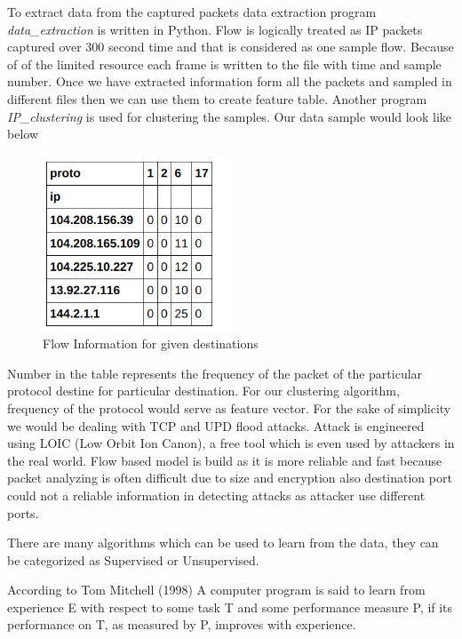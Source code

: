\documentclass[10pt,oneside,a4paper]{report}
\begin{document}
To extract data from the captured packets data extraction program \textit{data\_extraction} is written in Python. Flow is logically treated as IP packets captured over 300 second time and that is considered as one sample flow. Because of of the limited resource each frame is written to the file with time and sample number. Once we have extracted information form all the packets and sampled in different files then we can use them to create feature table. Another program \textit{IP\_clustering} is used for clustering the samples. Our data sample would look like below\par
\begin{figure}[H]
  \centering
    \includegraphics[width=0.50\textwidth]{dataframe.png}
    \caption{Flow Information for given destinations}
\end{figure}


Number in the table represents the frequency of the packet of the particular protocol destine for particular destination. For our clustering algorithm, frequency of the protocol would serve as feature vector. For the sake of simplicity we would be dealing with TCP and UPD flood attacks. Attack is engineered using LOIC (Low Orbit Ion Canon), a free tool which is even used by attackers in the real world. Flow based model is build as it is more reliable and fast because packet analyzing is often difficult due to size and encryption also destination port could not a reliable information in detecting attacks as attacker use different ports.

There are many algorithms which can be used to learn from the data, they can be categorized as Supervised or Unsupervised.

According to Tom Mitchell (1998) A computer program is said to learn from experience E with respect to some task T and some performance measure P, if its performance on T, as measured by P, improves with experience.
\end{document}
